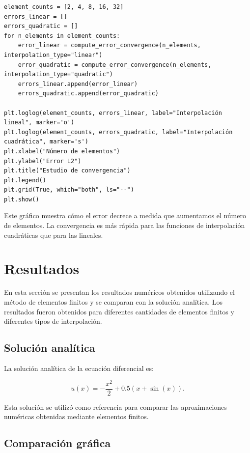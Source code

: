 \begin{verbatim}
element_counts = [2, 4, 8, 16, 32]
errors_linear = []
errors_quadratic = []
for n_elements in element_counts:
    error_linear = compute_error_convergence(n_elements, interpolation_type="linear")
    error_quadratic = compute_error_convergence(n_elements, interpolation_type="quadratic")
    errors_linear.append(error_linear)
    errors_quadratic.append(error_quadratic)
    
plt.loglog(element_counts, errors_linear, label="Interpolación lineal", marker='o')
plt.loglog(element_counts, errors_quadratic, label="Interpolación cuadrática", marker='s')
plt.xlabel("Número de elementos")
plt.ylabel("Error L2")
plt.title("Estudio de convergencia")
plt.legend()
plt.grid(True, which="both", ls="--")
plt.show()
\end{verbatim}

Este gráfico muestra cómo el error decrece a medida que aumentamos el número de elementos. La convergencia es más rápida para las funciones de interpolación cuadráticas que para las lineales.




\chapter{Resultados}


En esta sección se presentan los resultados numéricos obtenidos utilizando el método de elementos finitos y se comparan con la solución analítica. Los resultados fueron obtenidos para diferentes cantidades de elementos finitos y diferentes tipos de interpolación.

\section{Solución analítica}

La solución analítica de la ecuación diferencial es:

\begin{equation}
u(x) = -\frac{x^2}{2} + 0.5(x + \sin(x)).
\end{equation}

Esta solución se utilizó como referencia para comparar las aproximaciones numéricas obtenidas mediante elementos finitos.

\section{Comparación gráfica}

